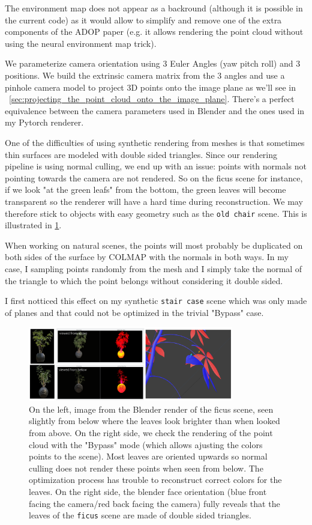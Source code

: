 The environment map does not appear as a backround (although it is possible in the current code) as it would allow to simplify and remove one of the extra components of the ADOP paper (e.g. it allows rendering the point cloud without using the neural environment map trick).

We parameterize camera orientation using 3 Euler Angles (yaw pitch roll) and 3 positions. We build the extrinsic camera matrix from the 3 angles and use a pinhole camera model to project 3D points onto the image plane as we'll see in ~\cref{sec:projecting_the_point_cloud_onto_the_image_plane}. There's a perfect equivalence between the camera parameters used in Blender and the ones used in my Pytorch renderer.

One of the difficulties of using synthetic rendering from meshes is that sometimes thin surfaces are modeled with double sided triangles. Since our rendering pipeline is using normal culling, we end up with an issue: points with normals not pointing towards the camera are not rendered. So on the ficus scene for instance, if we look "at the green leafs" from the bottom, the green leaves will become transparent so the renderer will have a hard time during reconstruction. We may therefore stick to objects with easy geometry such as the \texttt{old chair} scene. This is illustrated in \cref{fig:ficus_culling_issue}.

When working on natural scenes, the points will most probably be duplicated on both sides of the surface by COLMAP with the normals in both ways. In my case, I sampling points randomly from the mesh and I simply take the normal of the triangle to which the point belongs without considering it double sided.

I first notticed this effect on my synthetic \texttt{stair case} scene which was only made of planes and that could not be optimized in the trivial "Bypass" case.

\begin{figure}
    \centering
    \includegraphics[width=0.8\textwidth]{figures/double_sided_surfaces_issues.png}
    \caption{On the left, image from the Blender render of the ficus scene, seen slightly from below where the leaves look brighter than when looked from above. On the right side, we check the rendering of the point cloud with the "Bypass" mode (which allows ajusting the colors points to the scene). Most leaves are oriented upwards so normal culling does not render these points when seen from below. The optimization process has trouble to reconstruct correct colors for the leaves. On the right side, the blender face orientation (blue front facing the camera/red back facing the camera) fully reveals that the leaves of the \texttt{ficus} scene are made of double sided triangles.}
    \label{fig:ficus_culling_issue}
\end{figure}

